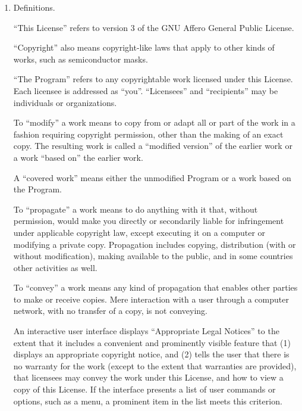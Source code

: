 \documentclass[11pt]{article}
\begin{document}
\begin{enumerate}

    \addtocounter{enumi}{-1}

    \item Definitions.

          ``This License'' refers to version 3 of the GNU Affero General Public License.

          ``Copyright'' also means copyright-like laws that apply to other kinds of
          works, such as semiconductor masks.

          ``The Program'' refers to any copyrightable work licensed under this
          License.  Each licensee is addressed as ``you''.  ``Licensees'' and
          ``recipients'' may be individuals or organizations.

          To ``modify'' a work means to copy from or adapt all or part of the work
          in a fashion requiring copyright permission, other than the making of an
          exact copy.  The resulting work is called a ``modified version'' of the
          earlier work or a work ``based on'' the earlier work.

          A ``covered work'' means either the unmodified Program or a work based
          on the Program.

          To ``propagate'' a work means to do anything with it that, without
          permission, would make you directly or secondarily liable for
          infringement under applicable copyright law, except executing it on a
          computer or modifying a private copy.  Propagation includes copying,
          distribution (with or without modification), making available to the
          public, and in some countries other activities as well.

          To ``convey'' a work means any kind of propagation that enables other
          parties to make or receive copies.  Mere interaction with a user through
          a computer network, with no transfer of a copy, is not conveying.

          An interactive user interface displays ``Appropriate Legal Notices''
          to the extent that it includes a convenient and prominently visible
          feature that (1) displays an appropriate copyright notice, and (2)
          tells the user that there is no warranty for the work (except to the
          extent that warranties are provided), that licensees may convey the
          work under this License, and how to view a copy of this License.  If
          the interface presents a list of user commands or options, such as a
          menu, a prominent item in the list meets this criterion.


\end{enumerate}
\end{document}
